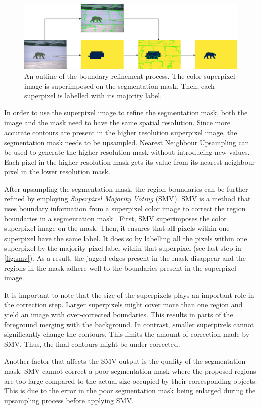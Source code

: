 \begin{figure}[htbp]
    \centering
    \includegraphics[width=\linewidth]{figures/smv.pdf}
    \caption{An outline of the boundary refinement process. The color superpixel image is superimposed on the segmentation mask. Then, each superpixel is labelled with its majority label.}
    \label{fig:smv}
\end{figure}

In order to use the superpixel image to refine the segmentation mask, both the image and the mask need to have the same spatial resolution. Since more accurate contours are present in the higher resolution superpixel image, the segmentation mask needs to be upsampled. Nearest Neighbour Upsampling can be used to generate the higher resolution mask without introducing new values. Each pixel in the higher resolution mask gets its value from its nearest neighbour pixel in the lower resolution mask.

After upsampling the segmentation mask, the region boundaries can be further refined by employing \emph{Superpixel Majority Voting} (SMV). SMV is a method that uses boundary information from a superpixel color image to correct the region boundaries in a segmentation mask \parencite{feng2021superpixel}. First, SMV superimposes the color superpixel image on the mask. Then, it ensures that all pixels within one superpixel have the same label. It does so by labelling all the pixels within one superpixel by the majority pixel label within that superpixel (see last step in \autoref{fig:smv}). As a result, the jagged edges present in the mask disappear and the regions in the mask adhere well to the boundaries present in the superpixel image.

It is important to note that the size of the superpixels plays an important role in the correction step. Larger superpixels might cover more than one region and yield an image with over-corrected boundaries. This results in parts of the foreground merging with the background. In contrast, smaller superpixels cannot significantly change the contours. This limits the amount of correction made by SMV. Thus, the final contours might be under-corrected.

Another factor that affects the SMV output is the quality of the segmentation mask. SMV cannot correct a poor segmentation mask where the proposed regions are too large compared to the actual size occupied by their corresponding objects. This is due to the error in the poor segmentation mask being enlarged during the upsampling process before applying SMV.